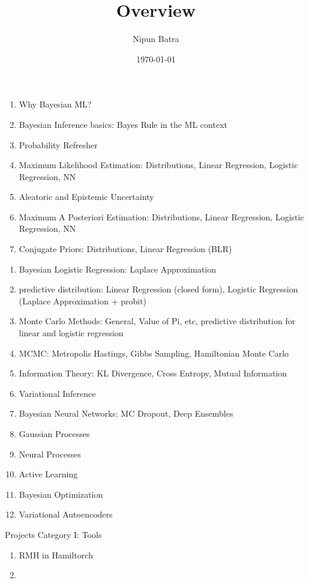\documentclass[handout]{beamer}
\begin{document}
\title{Overview}
\author{Nipun Batra}
\date{\today}
\maketitle


\begin{frame}
    \begin{enumerate}
        \item Why Bayesian ML?
        \item Bayesian Inference basics: Bayes Rule in the ML context
        \item Probability Refresher
        \item Maximum Likelihood Estimation: Distributions, Linear Regression, Logistic Regression, NN
        \item Aleatoric and Epistemic Uncertainty
        \item Maximum A Posteriori Estimation: Distributions, Linear Regression, Logistic Regression, NN
        \item Conjugate Priors: Distributions, Linear Regression (BLR)
    \end{enumerate}
\end{frame}

\begin{frame}

    \begin{enumerate}
        \item Bayesian Logistic Regression: Laplace Approximation
        \item predictive distribution: Linear Regression (closed form), Logistic Regression (Laplace Approximation + probit)
        \item Monte Carlo Methods: General, Value of Pi, etc, predictive distribution for linear and logistic regression
        \item MCMC: Metropolis Hastings, Gibbs Sampling, Hamiltonian Monte Carlo
        \item Information Theory: KL Divergence, Cross Entropy, Mutual Information
        \item Variational Inference
        \item Bayesian Neural Networks: MC Dropout, Deep Ensembles
        \item Gaussian Processes
        \item Neural Processes
        \item Active Learning
        \item Bayesian Optimization
        \item Variational Autoencoders
    \end{enumerate}
    
\end{frame}

\begin{frame}{Projects Category I: Tools}
    \begin{enumerate}
        \item RMH in Hamiltorch
        \item 
    \end{enumerate}

    
\end{frame}
\end{document}
